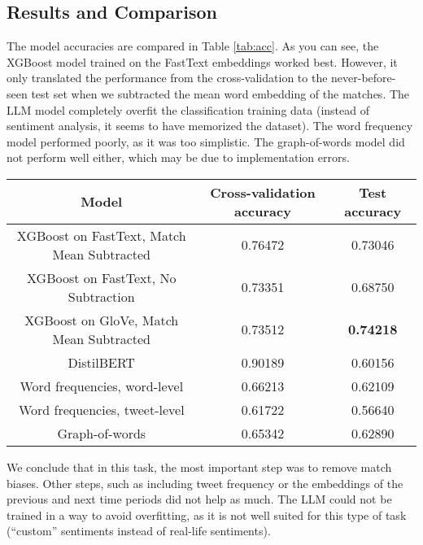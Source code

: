 \documentclass[twocolumn]{article}
\begin{document}
\subsection{Results and Comparison}
The model accuracies are compared in Table \ref{tab:acc}. As you can see, the XGBoost model trained
on the FastText embeddings worked best. However, it only translated the performance from the
cross-validation to the never-before-seen test set when we subtracted the mean word embedding of the
matches. The LLM model completely overfit the classification training data (instead of sentiment
analysis, it seems to have memorized the dataset). The word frequency model performed poorly, as it
was too simplistic. The graph-of-words model did not perform well either, which may be due to
implementation errors.

\begin{table*}[htb!]
    \centering
    \caption{Accuracy comparison for different models.}
    \label{tab:acc}
    \begin{tabular}{|c|c|c|}
        \hline
        Model & Cross-validation accuracy & Test accuracy \\ \hline
        XGBoost on FastText, Match Mean Subtracted & 0.76472 & 0.73046 \\ \hline
        XGBoost on FastText, No Subtraction & 0.73351 & 0.68750 \\ \hline
        XGBoost on GloVe, Match Mean Subtracted & 0.73512 & \textbf{0.74218} \\ \hline
        DistilBERT & 0.90189 & 0.60156 \\ \hline
        Word frequencies, word-level & 0.66213 & 0.62109 \\ \hline
        Word frequencies, tweet-level & 0.61722 & 0.56640 \\ \hline
        Graph-of-words & 0.65342 & 0.62890 \\ \hline
    \end{tabular}
\end{table*}

We conclude that in this task, the most important step was to remove match biases. Other steps, such
as including tweet frequency or the embeddings of the previous and next time periods did not help as
much. The LLM could not be trained in a way to avoid overfitting, as it is not well suited for this
type of task (``custom'' sentiments instead of real-life sentiments).


\end{document}
